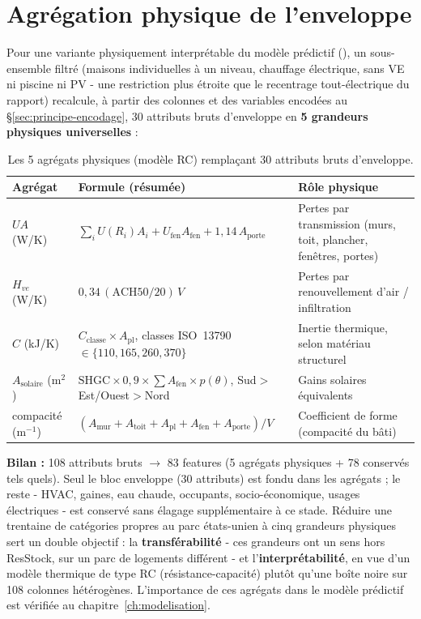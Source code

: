 \section{Agrégation physique de l'enveloppe}
\label{sec:agregation-physique}
\begin{resultbox}
Pour une variante physiquement interprétable du modèle prédictif (), un
sous-ensemble filtré (maisons individuelles à un niveau, chauffage électrique, sans VE ni piscine
ni PV - une restriction plus étroite que le recentrage tout-électrique du rapport) recalcule,
à partir des colonnes  et des variables encodées au \S\ref{sec:principe-encodage},
30 attributs bruts d'enveloppe en \textbf{5 grandeurs physiques universelles} :
\begin{table}[H]
\centering
\caption{Les 5 agrégats physiques (modèle RC) remplaçant 30 attributs bruts d'enveloppe.}
\label{tab:agregats-physiques}
\begin{tabular}{lp{5.6cm}p{5.4cm}}
\toprule
Agrégat & Formule (résumée) & Rôle physique \\
\midrule
$UA$ (W/K) & $\sum_i U(R_i)A_i + U_\mathrm{fen}A_\mathrm{fen} + 1{,}14\,A_\mathrm{porte}$ &
Pertes par transmission (murs, toit, plancher, fenêtres, portes) \\
$H_{ve}$ (W/K) & $0{,}34\,(\mathrm{ACH50}/20)\,V$ &
Pertes par renouvellement d'air / infiltration \\
$C$ (kJ/K) & $C_\mathrm{classe}\times A_\mathrm{pl}$, classes ISO~13790 $\in\{110,165,260,370\}$ &
Inertie thermique, selon matériau structurel \\
$A_\mathrm{solaire}$ (m$^2$) & $\mathrm{SHGC}\times 0{,}9\times\sum A_\mathrm{fen}\times
p(\theta)$, Sud$>$Est/Ouest$>$Nord & Gains solaires équivalents \\
compacité (m$^{-1}$) & $(A_\mathrm{mur}\!+\!A_\mathrm{toit}\!+\!A_\mathrm{pl}\!+\!A_\mathrm{fen}\!+
\!A_\mathrm{porte})/V$ & Coefficient de forme (compacité du bâti) \\
\bottomrule
\end{tabular}
\end{table}

\textbf{Bilan :} 108 attributs bruts $\to$ 83 features (5 agrégats physiques + 78 conservés tels
quels). Seul le bloc enveloppe (30 attributs) est fondu dans les agrégats ; le reste - HVAC,
gaines, eau chaude, occupants, socio-économique, usages électriques - est conservé sans
élagage supplémentaire à ce stade. Réduire une trentaine de catégories propres au parc
états-unien à cinq grandeurs physiques sert un double objectif : la \textbf{transférabilité} -
ces grandeurs ont un sens hors ResStock, sur un parc de logements différent - et
l'\textbf{interprétabilité}, en vue d'un modèle thermique de type RC (résistance-capacité)
plutôt qu'une boîte noire sur 108 colonnes hétérogènes. L'importance de ces agrégats dans le
modèle prédictif est vérifiée au chapitre~\ref{ch:modelisation}.
\end{resultbox}

